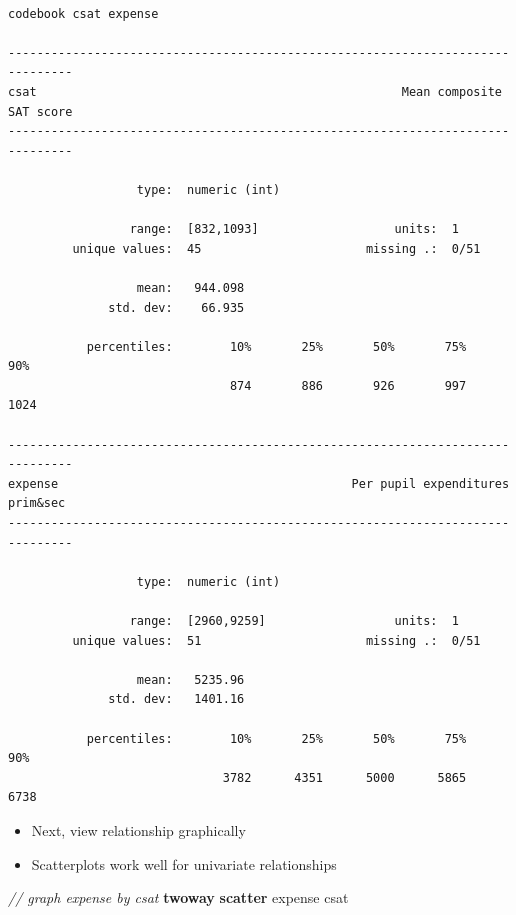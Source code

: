 \documentclass[]{book}
\newenvironment{Shaded}{\begin{snugshade}}{\end{snugshade}}
\newcommand{\CommentTok}[1]{\textcolor[rgb]{0.56,0.35,0.01}{\textit{#1}}}
\newcommand{\KeywordTok}[1]{\textcolor[rgb]{0.13,0.29,0.53}{\textbf{#1}}}
\newcommand{\NormalTok}[1]{#1}
\providecommand{\tightlist}{%
  \setlength{\itemsep}{0pt}\setlength{\parskip}{0pt}}
\begin{document}
\begin{verbatim}

codebook csat expense

-------------------------------------------------------------------------------
csat                                                   Mean composite SAT score
-------------------------------------------------------------------------------

                  type:  numeric (int)

                 range:  [832,1093]                   units:  1
         unique values:  45                       missing .:  0/51

                  mean:   944.098
              std. dev:    66.935

           percentiles:        10%       25%       50%       75%       90%
                               874       886       926       997      1024

-------------------------------------------------------------------------------
expense                                         Per pupil expenditures prim&sec
-------------------------------------------------------------------------------

                  type:  numeric (int)

                 range:  [2960,9259]                  units:  1
         unique values:  51                       missing .:  0/51

                  mean:   5235.96
              std. dev:   1401.16

           percentiles:        10%       25%       50%       75%       90%
                              3782      4351      5000      5865      6738
\end{verbatim}

\begin{itemize}
\tightlist
\item
  Next, view relationship graphically
\item
  Scatterplots work well for univariate relationships
\end{itemize}

\begin{Shaded}
\begin{Highlighting}[]
  \CommentTok{// graph expense by csat}
  \KeywordTok{twoway} \KeywordTok{scatter}\NormalTok{ expense csat}
\end{Highlighting}
\end{Shaded}
\end{document}
